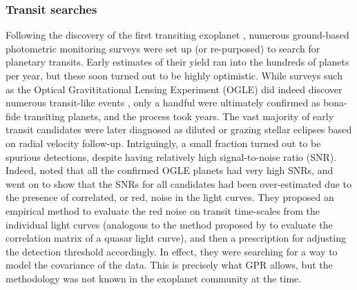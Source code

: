 \documentclass[letterpaper]{ar-1col}
\begin{document}

\subsubsection{Transit searches}

Following the discovery of the first transiting exoplanet \citep{2000ApJ...529L..41H,2000ApJ...529L..45C}, numerous ground-based photometric monitoring surveys were set up (or re-purposed) to search for planetary transits. Early estimates of their yield \citep[see e.g.][]{2003ASPC..294..361H} ran into the hundreds of planets per year, but these soon turned out to be highly optimistic. While surveys such as the Optical Gravititational Lensing Experiment (OGLE) did indeed discover numerous transit-like events
\citep[see e.g.][]{2002AcA....52....1U}, only a handful were ultimately confirmed as bona-fide transiting planets, and the process took years. %
The vast majority of early transit candidates were later diagnosed as diluted or grazing stellar eclipses based on radial velocity follow-up. 
Intriguingly, a small fraction turned out to be spurious detections, despite having relatively high signal-to-noise ratio (SNR). Indeed, \citet{2006MNRAS.373..231P} noted that all the confirmed OGLE planets had very high SNRs, and went on to show that the SNRs for all candidates had been over-estimated due to the presence of correlated, or red, noise in the light curves. They proposed an empirical method to evaluate the red noise on transit time-scales from the individual light curves (analogous to the method proposed by \citealt{prh92a} to evaluate the correlation matrix of a quasar light curve), and then a prescription for adjusting the detection threshold accordingly. In effect, they were searching for a way to model the covariance of the data. This is precisely what GPR allows, but the methodology was not known in the exoplanet community at the time.  
\end{document}
